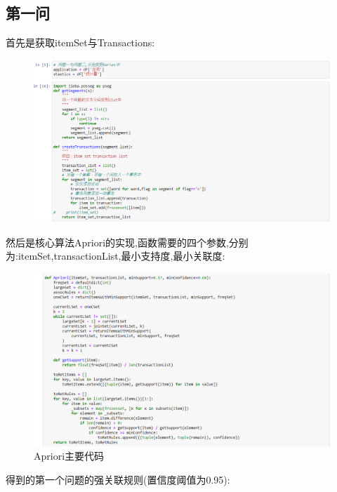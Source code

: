 \documentclass[lang=cn,11pt,a4paper,cite=authoryear]{elegantpaper}
\begin{document}
\subsection{第一问}
首先是获取itemSet与Transactions:\par
\clearpage
\begin{figure}[thbp!]
	\centering
	\includegraphics[width=1.1\linewidth]{image/item&trans}
\end{figure}
然后是核心算法Apriori的实现,函数需要的四个参数,分别为:itemSet,transactionList,最小支持度,最小关联度:\par
\begin{figure}[thbp!]
	\centering
	\includegraphics[width=1.1\linewidth]{image/Apriori}
	\caption{Apriori主要代码}
\end{figure}
得到的第一个问题的强关联规则(置信度阈值为0.95):\par
\end{document}
